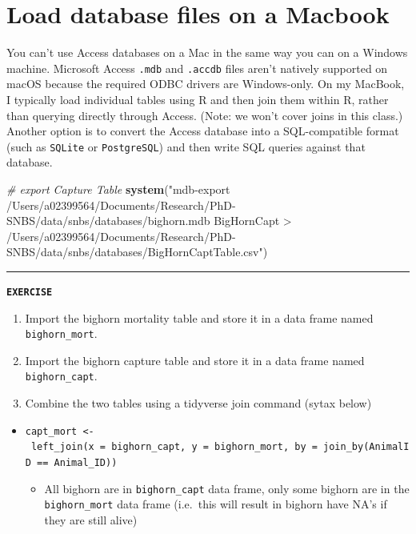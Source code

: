 \documentclass[
]{book}
\newenvironment{Shaded}{\begin{snugshade}}{\end{snugshade}}
\newcommand{\CommentTok}[1]{\textcolor[rgb]{0.56,0.35,0.01}{\textit{#1}}}
\newcommand{\FunctionTok}[1]{\textcolor[rgb]{0.13,0.29,0.53}{\textbf{#1}}}
\newcommand{\NormalTok}[1]{#1}
\newcommand{\StringTok}[1]{\textcolor[rgb]{0.31,0.60,0.02}{#1}}
\providecommand{\tightlist}{%
  \setlength{\itemsep}{0pt}\setlength{\parskip}{0pt}}
\begin{document}
\section{Load database files on a Macbook}\label{load-database-files-on-a-macbook}

You can't use Access databases on a Mac in the same way you can on a Windows machine. Microsoft Access \texttt{.mdb} and \texttt{.accdb} files aren't natively supported on macOS because the required ODBC drivers are Windows-only. On my MacBook, I typically load individual tables using R and then join them within R, rather than querying directly through Access. (Note: we won't cover joins in this class.) Another option is to convert the Access database into a SQL-compatible format (such as \texttt{SQLite} or \texttt{PostgreSQL}) and then write SQL queries against that database.

\begin{Shaded}
\begin{Highlighting}[]
\CommentTok{\# export Capture Table}
\FunctionTok{system}\NormalTok{(}\StringTok{"mdb{-}export /Users/a02399564/Documents/Research/PhD{-}SNBS/data/snbs/databases/bighorn.mdb BigHornCapt \textgreater{} /Users/a02399564/Documents/Research/PhD{-}SNBS/data/snbs/databases/BigHornCaptTable.csv"}\NormalTok{)}
\end{Highlighting}
\end{Shaded}

\begin{center}\rule{0.5\linewidth}{0.5pt}\end{center}

\textbf{\texttt{EXERCISE}}

\begin{enumerate}
\def\labelenumi{\arabic{enumi}.}
\tightlist
\item
  Import the bighorn mortality table and store it in a data frame named \texttt{bighorn\_mort}.
\item
  Import the bighorn capture table and store it in a data frame named \texttt{bighorn\_capt}.
\item
  Combine the two tables using a tidyverse join command (sytax below)
\end{enumerate}

\begin{itemize}
\tightlist
\item
  \texttt{capt\_mort\ \textless{}-\ left\_join(x\ =\ bighorn\_capt,\ y\ =\ bighorn\_mort,\ by\ =\ join\_by(AnimalID\ ==\ Animal\_ID))}

  \begin{itemize}
  \tightlist
  \item
    All bighorn are in \texttt{bighorn\_capt} data frame, only some bighorn are in the \texttt{bighorn\_mort} data frame (i.e.~this will result in bighorn have NA's if they are still alive)
  \end{itemize}
\end{itemize}
\end{document}
